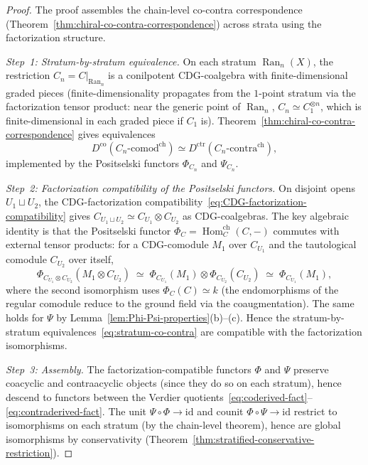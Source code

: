 \begin{proof}
The proof assembles the chain-level co-contra correspondence
(Theorem~\ref{thm:chiral-co-contra-correspondence}) across
strata using the factorization structure.

\emph{Step~1: Stratum-by-stratum equivalence.}
On each stratum $\operatorname{Ran}_n(X)$, the restriction
$C_n = C|_{\operatorname{Ran}_n}$ is a conilpotent CDG-coalgebra
with finite-dimensional graded pieces (finite-dimensionality
propagates from the $1$-point stratum via the factorization
tensor product: near the generic point of $\operatorname{Ran}_n$,
$C_n \simeq C_1^{\otimes n}$, which is finite-dimensional in each
graded piece if $C_1$ is).
Theorem~\ref{thm:chiral-co-contra-correspondence} gives
equivalences
\begin{equation}\label{eq:stratum-co-contra}
D^{\mathrm{co}}(C_n\text{-}\mathrm{comod}^{\mathrm{ch}})
\simeq
D^{\mathrm{ctr}}(C_n\text{-}\mathrm{contra}^{\mathrm{ch}}),
\end{equation}
implemented by the Positselski functors $\Phi_{C_n}$ and
$\Psi_{C_n}$.

\emph{Step~2: Factorization compatibility of the Positselski
functors.}
On disjoint opens $U_1 \sqcup U_2$, the CDG-factorization
compatibility~\eqref{eq:CDG-factorization-compatibility} gives
$C_{U_1 \sqcup U_2} \simeq C_{U_1} \otimes C_{U_2}$ as
CDG-coalgebras.  The key algebraic identity is that the
Positselski functor
$\Phi_C = \operatorname{Hom}_C^{\mathrm{ch}}(C, -)$ commutes
with external tensor products: for a CDG-comodule
$M_1$ over $C_{U_1}$ and the tautological comodule $C_{U_2}$
over itself,
\[
\Phi_{C_{U_1} \otimes C_{U_2}}(M_1 \otimes C_{U_2})
\;\simeq\;
\Phi_{C_{U_1}}(M_1) \otimes \Phi_{C_{U_2}}(C_{U_2})
\;\simeq\;
\Phi_{C_{U_1}}(M_1),
\]
where the second isomorphism uses
$\Phi_C(C) \simeq k$ (the endomorphisms of the regular comodule
reduce to the ground field via the coaugmentation).  The same
holds for $\Psi$ by
Lemma~\ref{lem:Phi-Psi-properties}(b)--(c).  Hence the
stratum-by-stratum equivalences~\eqref{eq:stratum-co-contra} are
compatible with the factorization isomorphisms.

\emph{Step~3: Assembly.}
The factorization-compatible functors $\Phi$ and $\Psi$ preserve
coacyclic and contraacyclic objects (since they do so on each
stratum), hence descend to functors between the Verdier
quotients~\eqref{eq:coderived-fact}--\eqref{eq:contraderived-fact}.
The unit $\Psi \circ \Phi \to \mathrm{id}$ and counit
$\Phi \circ \Psi \to \mathrm{id}$ restrict to isomorphisms on
each stratum (by the chain-level theorem), hence are global
isomorphisms by conservativity
(Theorem~\ref{thm:stratified-conservative-restriction}).
\end{proof}

